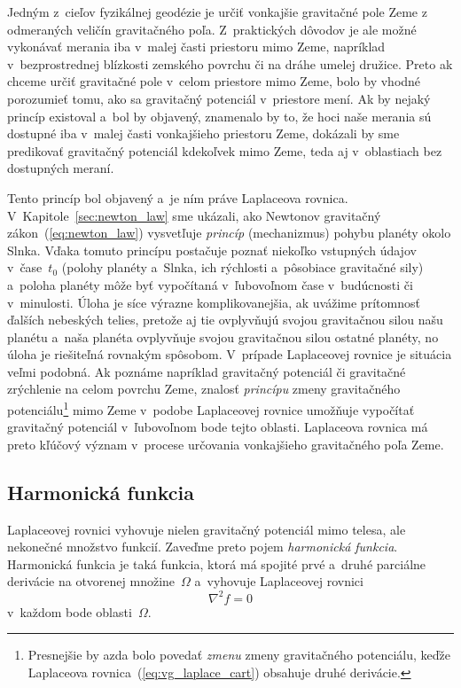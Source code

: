 \documentclass[a4paper,12pt]{book}
\begin{document}
Jedným z~cieľov fyzikálnej geodézie je určiť vonkajšie gravitačné pole Zeme 
z odmeraných veličín gravitačného poľa.  Z~praktických dôvodov je ale možné 
vykonávať merania iba v~malej časti priestoru mimo Zeme, napríklad 
v~bezprostrednej blízkosti zemského povrchu či na dráhe umelej družice.  Preto 
ak chceme určiť gravitačné pole v~celom priestore mimo Zeme, bolo by vhodné 
porozumieť tomu, ako sa gravitačný potenciál v~priestore mení.  Ak by nejaký 
princíp existoval a~bol by objavený, znamenalo by to, že hoci naše merania sú 
dostupné iba v~malej časti vonkajšieho priestoru Zeme, dokázali by sme 
predikovať gravitačný potenciál kdekoľvek mimo Zeme, teda aj v~oblastiach bez 
dostupných meraní.

Tento princíp bol objavený a~je ním práve Laplaceova rovnica.  
V~Kapitole~\ref{sec:newton_law} sme ukázali, ako Newtonov gravitačný 
zákon~(\ref{eq:newton_law}) vysvetľuje \emph{princíp} (mechanizmus) pohybu 
planéty okolo Slnka.  Vďaka tomuto princípu postačuje poznať niekoľko vstupných 
údajov v~čase~$t_0$ (polohy planéty a~Slnka, ich rýchlosti a~pôsobiace 
gravitačné sily) a~poloha planéty môže byť vypočítaná v~ľubovoľnom čase 
v~budúcnosti či v~minulosti.  Úloha je síce výrazne komplikovanejšia, ak 
uvážime prítomnosť ďalších nebeských telies, pretože aj tie ovplyvňujú svojou 
gravitačnou silou našu planétu a~naša planéta ovplyvňuje svojou gravitačnou 
silou ostatné planéty, no úloha je riešiteľná rovnakým spôsobom.  V~prípade 
Laplaceovej rovnice je situácia veľmi podobná.  Ak poznáme napríklad gravitačný 
potenciál či gravitačné zrýchlenie na celom povrchu Zeme, znalosť 
\emph{princípu} zmeny gravitačného potenciálu\footnote{Presnejšie by azda bolo 
povedať \textit{zmenu} zmeny gravitačného potenciálu, keďže Laplaceova 
rovnica~(\ref{eq:vg_laplace_cart}) obsahuje druhé derivácie.} mimo Zeme 
v~podobe Laplaceovej rovnice umožňuje vypočítať gravitačný potenciál 
v~ľubovoľnom bode tejto oblasti.  Laplaceova rovnica má preto kľúčový význam 
v~procese určovania vonkajšieho gravitačného poľa Zeme.




\subsection{Harmonická funkcia}
\label{sec:harmonic_function}

Laplaceovej rovnici vyhovuje nielen gravitačný potenciál mimo telesa, ale
nekonečné množstvo funkcií.  Zaveďme preto pojem \emph{harmonická funkcia}.
Harmonická funkcia je taká funkcia, ktorá má spojité prvé a~druhé parciálne
derivácie na otvorenej množine~$\Omega$ a~vyhovuje Laplaceovej rovnici
%
\begin{equation}
\nabla^2 f = 0
\end{equation}
%
v~každom bode oblasti~$\Omega$.
\end{document}
